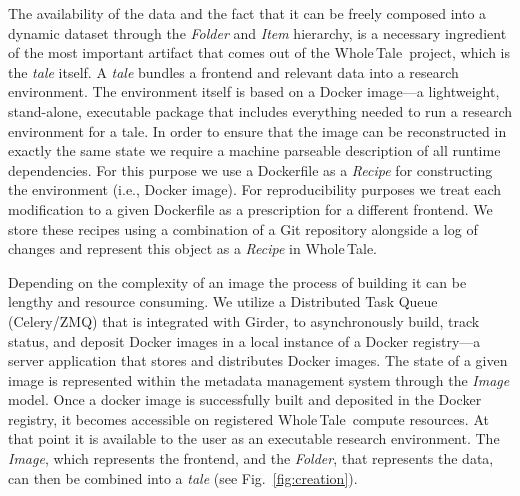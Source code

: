 \documentclass{elsarticle}
\newcommand{\wt}{Whole\,Tale}
\begin{document}
The availability of the data and the fact that it can be freely composed 
into a dynamic dataset through the \emph{Folder} and \emph{Item} hierarchy,
is a necessary ingredient of the most important artifact that comes out of the
\wt\ project, which is the \emph{tale} itself. A \emph{tale} bundles a frontend and relevant data into a research environment.
The environment itself is based on a Docker image---a
lightweight, stand-alone, executable package that includes
everything needed to run a research environment for a tale.
In order to ensure that the image can be reconstructed in 
exactly the same state we require a machine
parseable description of all runtime dependencies. 
For this purpose we use a Dockerfile
as a \emph{Recipe} for constructing the environment (i.e., Docker image). 
For reproducibility purposes we treat each modification
to a given Dockerfile as a prescription for a different frontend.
We store these recipes using a combination of a Git repository alongside
a log of changes and represent this object as a
\emph{Recipe} in \wt. 

Depending on the complexity of an image the process of building it
can be lengthy and resource consuming. We utilize a Distributed Task Queue
(Celery/ZMQ) that is integrated with Girder, to asynchronously build, track
status, and deposit Docker images in a local instance of a Docker registry---a
server application that stores and distributes Docker images. The state of a
given image is represented within the metadata management system through the
\emph{Image} model. Once a docker image is successfully built and deposited
in the Docker registry, it becomes accessible on registered \wt\ compute resources. At that point it is
available to the user as an executable research environment. The \emph{Image}, which represents the frontend, and the \emph{Folder}, that represents the data, can then be combined into a \emph{tale} (see Fig.~\ref{fig:creation}).
\end{document}

